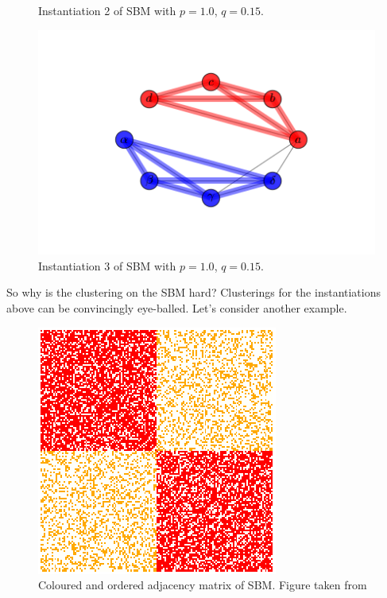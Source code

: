 \begin{figure}[h]
  \caption{Instantiation 2 of SBM with $p=1.0$, $q=0.15$.}\label{fig:awesome_image2}
\endminipage\hfill
{}%
  \includegraphics[width=\linewidth]{labels_and_colors_3.png}
  \caption{Instantiation 3 of SBM with $p=1.0$, $q=0.15$.}\label{fig:awesome_image3}
\endminipage
\end{figure}


So why is the clustering on the SBM hard?  Clusterings for the instantiations above can be convincingly eye-balled.  Let's consider another example.  

\begin{figure}[h]
\begin{center}
  \includegraphics[scale=0.5]{SBM}
  \caption{Coloured and ordered adjacency matrix of SBM. Figure taken from \cite{SBM_adjacency_talk}}
  \label{fig:SBM_matrix_colour}
 \end{center}
\end{figure}

